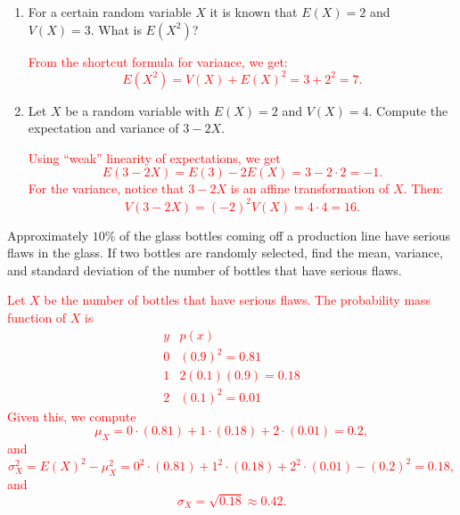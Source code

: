 \documentclass[12pt,reqno]{amsart}
\begin{document}
\bigskip
\prob

\begin{enumerate}
    \item For a certain random variable $X$ it is known that $E(X)=2$ and $V(X) = 3$. What is $E(X^2)$?
    
    \bigskip
    \textcolor{red}{From the shortcut formula for variance, we get:
        \[E(X^2) = V(X) + E(X)^2 = 3 + 2^2 = 7.\]}
    \bigskip


    \item Let $X$ be a random variable with $E(X)=2$ and $V(X)=4$. Compute the expectation and variance of $3-2X$.
    
    \bigskip
    \textcolor{red}{Using ``weak'' linearity of expectations, we get
        \[E(3-2X) = E(3) -2 E(X) = 3 - 2\cdot 2 = -1.\]
    For the variance, notice that $3-2X$ is an affine transformation of $X$. Then:
        \[V(3-2X) = (-2)^2 V(X) = 4\cdot 4 = 16.\]}
    
\end{enumerate}















\bigskip
\prob Approximately $10\%$ of the glass bottles coming off a production line have serious flaws in the glass. If two bottles are randomly selected, find the mean, variance, and standard deviation of the number of bottles that have serious flaws.

\bigskip
\textcolor{red}{Let $X$ be the number of bottles that have serious flaws. The probability mass function of $X$ is
    \[\begin{array}{c|c}
        y & p(x) \\ \hline
        0 & (0.9)^2 = 0.81   \\
        1 & 2(0.1)(0.9) = 0.18   \\
        2 & (0.1)^2 = 0.01
    \end{array}\]
Given this, we compute
    \[\mu_X = 0\cdot(0.81) + 1\cdot(0.18) + 2\cdot(0.01) = 0.2,\]
and
    \[\sigma^2_X = E(X)^2 - \mu^2_X = 0^2 \cdot(0.81)+ 1^2\cdot (0.18) + 2^2 \cdot(0.01) - (0.2)^2 = 0.18, \]
and
    \[\sigma_X = \sqrt{0.18} \approx 0.42.\]}
\bigskip
\end{document}
